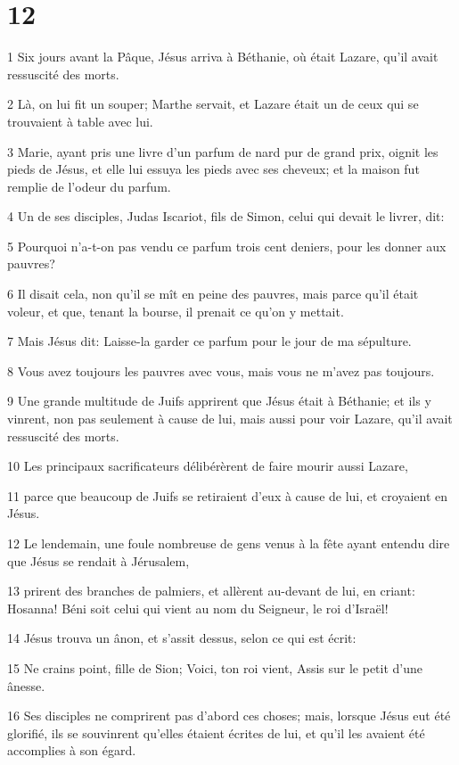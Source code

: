 \chapter{12}

\par 1 Six jours avant la Pâque, Jésus arriva à Béthanie, où était Lazare, qu'il avait ressuscité des morts.
\par 2 Là, on lui fit un souper; Marthe servait, et Lazare était un de ceux qui se trouvaient à table avec lui.
\par 3 Marie, ayant pris une livre d'un parfum de nard pur de grand prix, oignit les pieds de Jésus, et elle lui essuya les pieds avec ses cheveux; et la maison fut remplie de l'odeur du parfum.
\par 4 Un de ses disciples, Judas Iscariot, fils de Simon, celui qui devait le livrer, dit:
\par 5 Pourquoi n'a-t-on pas vendu ce parfum trois cent deniers, pour les donner aux pauvres?
\par 6 Il disait cela, non qu'il se mît en peine des pauvres, mais parce qu'il était voleur, et que, tenant la bourse, il prenait ce qu'on y mettait.
\par 7 Mais Jésus dit: Laisse-la garder ce parfum pour le jour de ma sépulture.
\par 8 Vous avez toujours les pauvres avec vous, mais vous ne m'avez pas toujours.
\par 9 Une grande multitude de Juifs apprirent que Jésus était à Béthanie; et ils y vinrent, non pas seulement à cause de lui, mais aussi pour voir Lazare, qu'il avait ressuscité des morts.
\par 10 Les principaux sacrificateurs délibérèrent de faire mourir aussi Lazare,
\par 11 parce que beaucoup de Juifs se retiraient d'eux à cause de lui, et croyaient en Jésus.
\par 12 Le lendemain, une foule nombreuse de gens venus à la fête ayant entendu dire que Jésus se rendait à Jérusalem,
\par 13 prirent des branches de palmiers, et allèrent au-devant de lui, en criant: Hosanna! Béni soit celui qui vient au nom du Seigneur, le roi d'Israël!
\par 14 Jésus trouva un ânon, et s'assit dessus, selon ce qui est écrit:
\par 15 Ne crains point, fille de Sion; Voici, ton roi vient, Assis sur le petit d'une ânesse.
\par 16 Ses disciples ne comprirent pas d'abord ces choses; mais, lorsque Jésus eut été glorifié, ils se souvinrent qu'elles étaient écrites de lui, et qu'il les avaient été accomplies à son égard.

